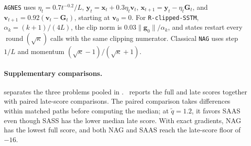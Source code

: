 \documentclass{article}
\begin{document}
\texttt{AGNES} uses \(\eta_t=0.7t^{-0.2}/L\),
\(\bm y_t=\bm x_t+0.3\eta_t\bm v_t\),
\(\bm x_{t+1}=\bm y_t-\eta_t\mathbf G_t\), and
\(\bm v_{t+1}=0.92(\bm v_t-\mathbf G_t)\), starting at \(\bm v_0=0\).
For \texttt{R-clipped-SSTM}, \(\alpha_k=(k+1)/(4L)\), the clip norm
is \(0.03\|\bm g_0\|/\alpha_k\), and states restart every
\(\operatorname{round}(\sqrt\kappa)\) calls with the same clipping numerator.
Classical \texttt{NAG} uses step \(1/L\) and momentum
\((\sqrt\kappa-1)/(\sqrt\kappa+1)\).

\paragraph{Supplementary comparisons.}
 separates the three problems pooled in . ~reports the full and late scores together with paired late-score comparisons. The paired comparison takes differences within matched paths before computing the median; at $\widetilde q=1.2$, it favors SAAS even though SASS has the lower median late score. With exact gradients, NAG has the lowest full score, and both NAG and SAAS reach the late-score floor of $-16$.
\end{document}
